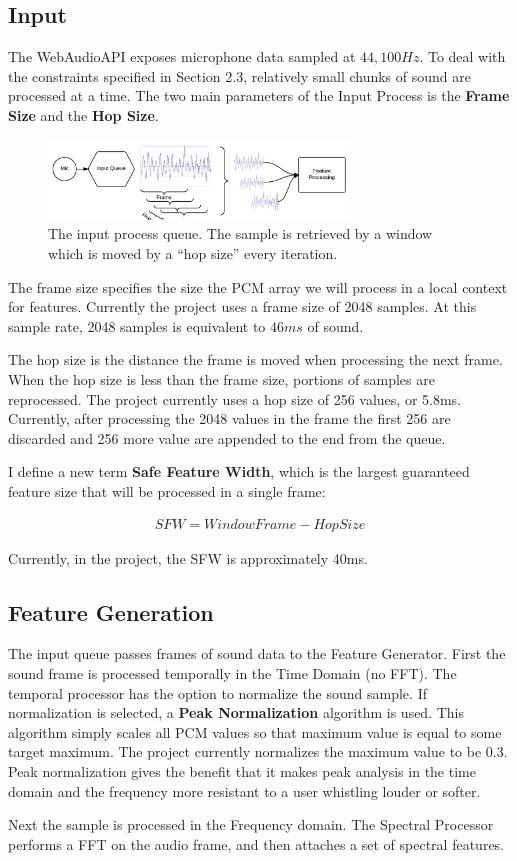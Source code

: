 \documentclass[DIV=calc, paper=a4, fontsize=11pt, twocolumn]{scrartcl}   %
\begin{document}
\subsection{Input}
The WebAudioAPI exposes microphone data sampled at $44,100Hz$. To deal with the constraints specified in Section 2.3, relatively small chunks of sound are processed at a time. The two main parameters of the Input Process is the \textbf{Frame Size} and the \textbf{Hop Size}.
\begin{figure}[h]
\centering
\includegraphics[width=80mm]{figures/InputDiagram.png}
\caption{The input process queue. The sample is retrieved by a window which is moved by a ``hop size'' every iteration.}
\label{overflow}
\end{figure}

The frame size specifies the size the PCM array we will process in a local context for features. Currently the project uses a frame size of 2048 samples. At this sample rate, 2048 samples is equivalent to $46ms$ of sound.
\par The hop size is the distance the frame is moved when processing the next frame. When the hop size is less than the frame size, portions of samples are reprocessed. The project currently uses a hop size of 256 values, or 5.8ms. Currently, after processing the 2048 values in the frame the first 256 are discarded and 256 more value are appended to the end from the queue. \par I define a new term \textbf{Safe Feature Width}, which is the largest guaranteed feature size that will be processed in a single frame:

\begin{align}
   SFW = WindowFrame - HopSize
\end{align}

Currently, in the project, the SFW is approximately 40ms.

\subsection{Feature Generation}


The input queue passes frames of sound data to the Feature Generator. First the sound frame is processed temporally in the Time Domain (no FFT). The temporal processor has the option to normalize the sound sample. If normalization is selected, a \textbf{Peak Normalization} algorithm is used. This algorithm simply scales all PCM values so that maximum value is equal to some target maximum. The project currently normalizes the maximum value to be $0.3$. Peak normalization gives the benefit that it makes peak analysis in the time domain and the frequency more resistant to a user whistling louder or softer.
\par Next the sample is processed in the Frequency domain. The Spectral Processor performs a FFT on the audio frame, and then attaches a set of spectral features.
\end{document}
